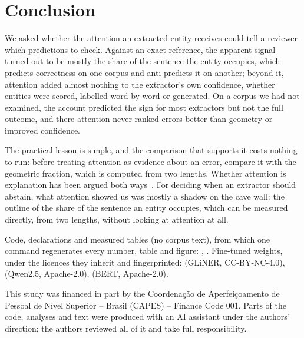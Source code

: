 \documentclass[11pt,a4paper]{article}
\newcommand{\gliner}{GLiNER}
\begin{document}
\section{Conclusion}
\label{sec:conclusion}

We asked whether the attention an extracted entity receives could tell a reviewer which predictions to check. Against an
exact reference, the apparent signal turned out to be mostly the share of the sentence the entity occupies, which predicts
correctness on one corpus and anti-predicts it on another; beyond it, attention added almost nothing to the extractor's own
confidence, whether entities were scored, labelled word by word or generated. On a corpus we had not examined, the account
predicted the sign for most extractors but not the full outcome, and there attention never ranked errors better than
geometry or improved confidence.

The practical lesson is simple, and the comparison that supports it costs nothing to run: before treating attention as
evidence about an error, compare it with the geometric fraction, which is computed from two lengths. Whether attention is
explanation has been argued both ways~\citep{jain-wallace-2019-attention,wiegreffe-pinter-2019-attention}. For deciding when
an extractor should abstain, what attention showed us was mostly a shadow on the cave wall: the outline of the share of the
sentence an entity occupies, which can be measured directly, from two lengths, without looking at attention at all.

Code, declarations and measured tables (no corpus text), from which one command regenerates every number, table and
figure: \repoURL{}, \codeDOI. Fine-tuned weights, under the licences they inherit and fingerprinted: \weightsDOIgliner{}
(\gliner{}, CC-BY-NC-4.0), \weightsDOIqwen{} (Qwen2.5, Apache-2.0), \weightsDOIbert{} (BERT, Apache-2.0).

\begin{acknowledgments}
This study was financed in part by the Coordenação de Aperfeiçoamento de Pessoal de Nível Superior -- Brasil (CAPES) --
Finance Code 001. Parts of the code, analyses and text were produced with an AI assistant under the authors' direction; the
authors reviewed all of it and take full responsibility.
\end{acknowledgments}



\end{document}
